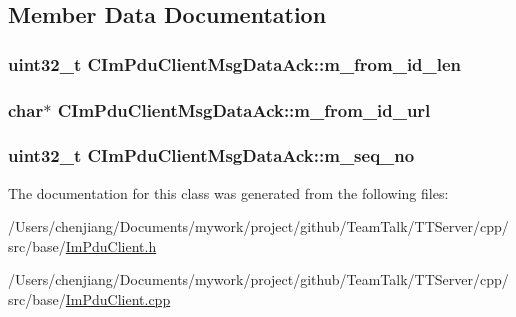 \subsection{Member Data Documentation}
\hypertarget{class_c_im_pdu_client_msg_data_ack_ad2de93f94b6f4756e5a3512869c5a47a}{}
\subsubsection[{m\+\_\+from\+\_\+id\+\_\+len}]{\setlength{\rightskip}{0pt plus 5cm}uint32\+\_\+t C\+Im\+Pdu\+Client\+Msg\+Data\+Ack\+::m\+\_\+from\+\_\+id\+\_\+len\hspace{0.3cm}{\ttfamily [private]}}\label{class_c_im_pdu_client_msg_data_ack_ad2de93f94b6f4756e5a3512869c5a47a}
\hypertarget{class_c_im_pdu_client_msg_data_ack_a40589a62b32846b64033de5364d781f2}{}
\subsubsection[{m\+\_\+from\+\_\+id\+\_\+url}]{\setlength{\rightskip}{0pt plus 5cm}char$\ast$ C\+Im\+Pdu\+Client\+Msg\+Data\+Ack\+::m\+\_\+from\+\_\+id\+\_\+url\hspace{0.3cm}{\ttfamily [private]}}\label{class_c_im_pdu_client_msg_data_ack_a40589a62b32846b64033de5364d781f2}
\hypertarget{class_c_im_pdu_client_msg_data_ack_a8211039cc4543de22385e90a9fa114ad}{}
\subsubsection[{m\+\_\+seq\+\_\+no}]{\setlength{\rightskip}{0pt plus 5cm}uint32\+\_\+t C\+Im\+Pdu\+Client\+Msg\+Data\+Ack\+::m\+\_\+seq\+\_\+no\hspace{0.3cm}{\ttfamily [private]}}\label{class_c_im_pdu_client_msg_data_ack_a8211039cc4543de22385e90a9fa114ad}


The documentation for this class was generated from the following files\+:\begin{DoxyCompactItemize}
\item 
/\+Users/chenjiang/\+Documents/mywork/project/github/\+Team\+Talk/\+T\+T\+Server/cpp/src/base/\hyperlink{_im_pdu_client_8h}{Im\+Pdu\+Client.\+h}\item 
/\+Users/chenjiang/\+Documents/mywork/project/github/\+Team\+Talk/\+T\+T\+Server/cpp/src/base/\hyperlink{_im_pdu_client_8cpp}{Im\+Pdu\+Client.\+cpp}\end{DoxyCompactItemize}
